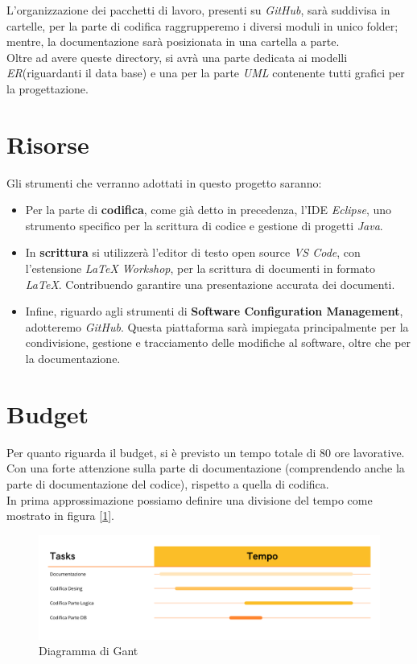 \documentclass[12pt, letterpaper]{book}
\begin{document}
L'organizzazione dei pacchetti di lavoro, presenti su \textit{GitHub}, sarà suddivisa in cartelle, per la parte di codifica raggrupperemo i diversi moduli in unico folder; mentre, la documentazione sarà posizionata in una cartella a parte.\\

Oltre ad avere queste directory, si avrà una parte dedicata ai modelli \textit{ER}(riguardanti il data base) e una per la parte \textit{UML} contenente tutti grafici per la progettazione. 

\section{Risorse}

Gli strumenti che verranno adottati in questo progetto saranno:
\begin{itemize}
    \item Per la parte di \textbf{codifica}, come già detto in precedenza, l'IDE \textit{Eclipse}, uno strumento specifico per la scrittura di codice e gestione di progetti \textit{Java}.
    \item In \textbf{scrittura} si utilizzerà l'editor di testo open source \textit{VS Code}, con l'estensione \textit{LaTeX Workshop}, per la scrittura di documenti in formato \textit{LaTeX}. Contribuendo garantire una presentazione accurata dei documenti.
    \item Infine, riguardo agli strumenti di \textbf{Software Configuration Management}, adotteremo \textit{GitHub}. Questa piattaforma sarà impiegata principalmente per la condivisione, gestione e tracciamento delle modifiche al software, oltre che per la documentazione. 

\end{itemize}

\section{Budget}

    Per quanto riguarda il budget, si è previsto un tempo totale di 80 ore lavorative. Con una forte attenzione sulla parte di documentazione (comprendendo anche la parte di documentazione del codice), rispetto a quella di codifica.\\

    In prima approssimazione possiamo definire una divisione del tempo come mostrato in figura [\ref{fig: diagramma_gant}]. 
    \begin{figure}[h]
        \centering
        \includegraphics[width = 1\linewidth]{Diagramma_Gant.jpg}
        \caption{Diagramma di Gant}
        \label{fig: diagramma_gant}    
    \end{figure}
\end{document}
